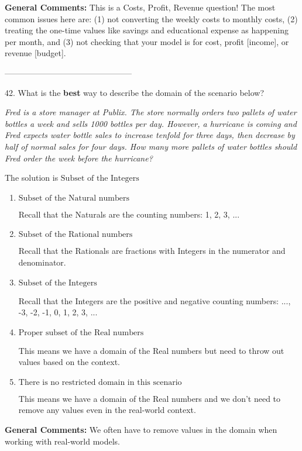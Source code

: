 \documentclass{article}[14pt]
\begin{document}
\textbf{General Comments:} This is a Costs, Profit, Revenue question! The most common issues here are: (1) not converting the weekly costs to monthly costs, (2) treating the one-time values like savings and educational expense as happening per month, and (3) not checking that your model is for cost, profit [income], or revenue [budget].

-----------------------------------------------

42. What is the \textbf{best} way to describe the domain of the scenario below?
\begin{center} \textit{Fred is a store manager at Publix. The store normally orders two pallets of water bottles a week and sells 1000 bottles per day. However, a hurricane is coming and Fred expects water bottle sales to increase tenfold for three days, then decrease by half of normal sales for four days. How many more pallets of water bottles should Fred order the week before the hurricane?} \end{center} 
The solution is $ \text{Subset of the Integers} $ 

\begin{enumerate}[label=\Alph*.] 
\item $ \text{Subset of the Natural numbers} $ 

 Recall that the Naturals are the counting numbers: 1, 2, 3, ... 
\item $ \text{Subset of the Rational numbers} $ 

 Recall that the Rationals are fractions with Integers in the numerator and denominator. 
\item $ \text{Subset of the Integers} $ 

 Recall that the Integers are the positive and negative counting numbers: ..., -3, -2, -1, 0, 1, 2, 3, ...  
\item $ \text{Proper subset of the Real numbers} $ 

 This means we have a domain of the Real numbers but need to throw out values based on the context. 
\item $ \text{There is no restricted domain in this scenario} $ 

 This means we have a domain of the Real numbers and we don't need to remove any values even in the real-world context. 
\end{enumerate} 
 
\textbf{General Comments:} We often have to remove values in the domain when working with real-world models.
\end{document}
